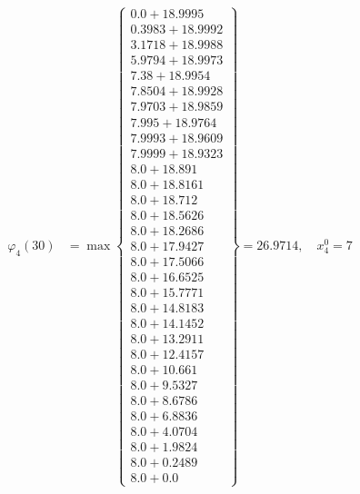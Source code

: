 \documentclass{article}
\begin{document}
\begin{align*}
\varphi_{4}(30) &= \max \left\{ \begin{array}{c}
0.0 + 18.9995 \\
 0.3983 + 18.9992 \\
 3.1718 + 18.9988 \\
 5.9794 + 18.9973 \\
 7.38 + 18.9954 \\
 7.8504 + 18.9928 \\
 7.9703 + 18.9859 \\
 7.995 + 18.9764 \\
 7.9993 + 18.9609 \\
 7.9999 + 18.9323 \\
 8.0 + 18.891 \\
 8.0 + 18.8161 \\
 8.0 + 18.712 \\
 8.0 + 18.5626 \\
 8.0 + 18.2686 \\
 8.0 + 17.9427 \\
 8.0 + 17.5066 \\
 8.0 + 16.6525 \\
 8.0 + 15.7771 \\
 8.0 + 14.8183 \\
 8.0 + 14.1452 \\
 8.0 + 13.2911 \\
 8.0 + 12.4157 \\
 8.0 + 10.661 \\
 8.0 + 9.5327 \\
 8.0 + 8.6786 \\
 8.0 + 6.8836 \\
 8.0 + 4.0704 \\
 8.0 + 1.9824 \\
 8.0 + 0.2489 \\
 8.0 + 0.0
\end{array} \right\}=26.9714, \quad x_{4}^0=7\\
  

\end{align*}
\end{document}
